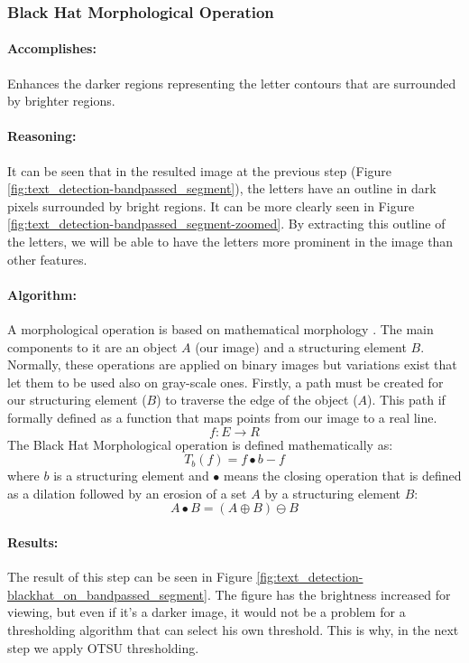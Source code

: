 \subsubsection{Black Hat Morphological Operation}
\label{subsubsec:bh-morpho-op}

\paragraph*{Accomplishes:}\mbox{}\par
Enhances the darker regions representing the letter contours that are surrounded by brighter regions.

\paragraph*{Reasoning:}\mbox{}\par
It can be seen that in the resulted image at the previous step (Figure \ref{fig:text_detection-bandpassed_segment}), the letters have an outline in dark pixels surrounded by bright regions. It can be more clearly seen in Figure \ref{fig:text_detection-bandpassed_segment-zoomed}. By extracting this outline of the letters, we will be able to have the letters more prominent in the image than other features.

\paragraph*{Algorithm:}\mbox{}\par
A morphological operation is based on mathematical morphology \cite{article:mathematical-morphology}. The main components to it are an object $A$ (our image) and a structuring element $B$. Normally, these operations are applied on binary images but variations exist that let them to be used also on gray-scale ones. Firstly, a path must be created for our structuring element ($B$) to traverse the edge of the object ($A$). This path if formally defined as a function that maps points from our image to a real line.
\[f:E \rightarrow R\]
The Black Hat Morphological operation is defined mathematically as:
\[T_b(f) = f \bullet b - f\]
where $b$ is a structuring element and $\bullet$ means the closing operation that is defined as a dilation followed by an erosion of a set $A$ by a structuring element $B$:
\[A \bullet B = (A \oplus B) \ominus B\]

\paragraph*{Results:}\mbox{}\par
The result of this step can be seen in Figure \ref{fig:text_detection-blackhat_on_bandpassed_segment}. The figure has the brightness increased for viewing, but even if it's a darker image, it would not be a problem for a thresholding algorithm that can select his own threshold. This is why, in the next step we apply OTSU thresholding.

